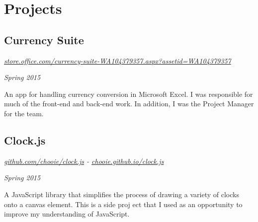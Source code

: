 \section*{Projects}

\subsection*{Currency Suite}
\begin{minipage}[b]{0.8\textwidth}
  \flushleft
  \emph{\href{https://store.office.com/currency-suite-WA104379357.aspx?assetid=WA104379357} {store.office.com/currency-suite-WA104379357.aspx?assetid=WA104379357}}
\end{minipage}
\begin{minipage}[b]{0.2\textwidth}
  \flushright
  \emph{Spring 2015}
\end{minipage}
An app for handling currency conversion in Microsoft  Excel. I was responsible for much of the front-end and back-end work. In addition, I was the Project Manager for the team.

\subsection*{Clock.js}
\begin{minipage}[b]{0.5\textwidth}
  \flushleft
  \emph{\href{https://github.com/chooie/clock.js} {github.com/chooie/clock.js} - \href {https://chooie.github.io/clock.js} {chooie.github.io/clock.js}}
\end{minipage}
\begin{minipage}[b]{0.5\textwidth}
  \flushright
  \emph{Spring 2015}
\end{minipage}
A JavaScript library that simplifies the process of drawing a variety of clocks onto a canvas element. This is a side proj
ect that I used as an opportunity to improve my understanding of JavaScript.

